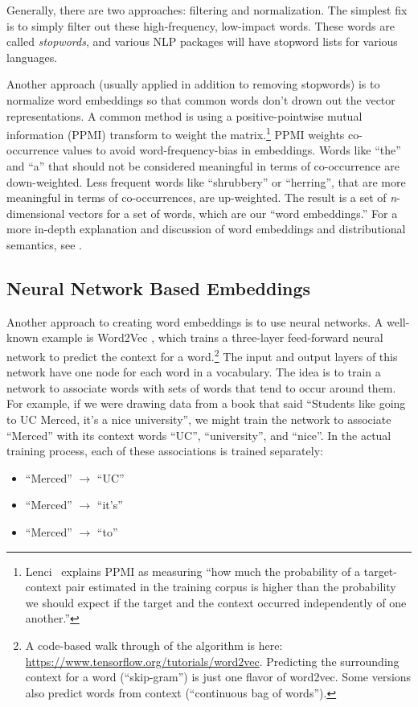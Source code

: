 Generally, there are two approaches: filtering and normalization. The simplest fix is to simply filter out these high-frequency, low-impact words. These words are called \emph{stopwords}, and various NLP packages will have stopword lists for various languages.

Another approach (usually applied in addition to removing stopwords) is to normalize word embeddings so that common words don't drown out the vector representations. A common method is using a positive-pointwise mutual information (PPMI) transform to weight the matrix.\footnote{Lenci~\cite{lenci2018distributional} explains PPMI as measuring ``how much the probability of a target-context pair estimated in the training corpus is higher than the probability we should expect if the target and the context occurred independently of one another.''} PPMI weights co-occurrence values to avoid word-frequency-bias in embeddings. Words like ``the'' and ``a'' that should not be considered meaningful in terms of co-occurrence are down-weighted. Less frequent words like ``shrubbery'' or ``herring'', that are more meaningful in terms of co-occurrences, are up-weighted. The result is a set of \textit{n}-dimensional vectors for a set of words, which are our ``word embeddings.'' For a more in-depth explanation and discussion of word embeddings and distributional semantics, see \cite{lenci2018distributional}.

\subsection{Neural Network Based Embeddings}



Another approach to creating word embeddings is to use neural networks. A well-known example is Word2Vec \cite{mikolov2013distributed}, which trains a three-layer feed-forward neural network to predict the context for a word.\footnote{A code-based walk through of the algorithm is here: \url{https://www.tensorflow.org/tutorials/word2vec}. Predicting the surrounding context for a word (``skip-gram'') is just one flavor of word2vec. Some versions also predict words from context (``continuous bag of words''). } The input and output layers of this network have one node for each word in a vocabulary. The idea is to train a network to associate words with sets of words that tend to occur around them. For example, if we were drawing data from a book that said ``Students like going to UC Merced, it's a nice university'', we might train the network to associate ``Merced'' with its context words ``UC'', ``university'', and ``nice''.  In the actual training process, each of these associations is trained separately:
\begin{itemize}
\item ``Merced'' $\longrightarrow$ ``UC''
\item ``Merced'' $\longrightarrow$ ``it's''
\item ``Merced'' $\longrightarrow$ ``to''
\end{itemize}


